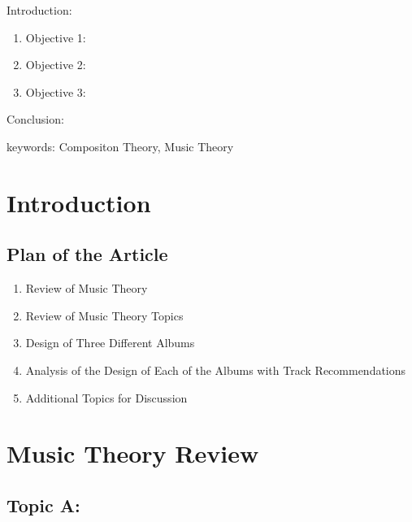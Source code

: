 


\twocolumn
\scriptsize
\begin{frontmatter}
		\title{}
		\author{}
		\address{The Mathematical Learning Space}
\end{frontmatter}	

Introduction:
\begin{enumerate}
\item Objective 1:
\item Objective 2:
\item Objective 3:
\end{enumerate}
Conclusion:

keywords: Compositon Theory, Music Theory

\section{Introduction}


\subsection{Plan of the Article}

\begin{enumerate}
\item Review of Music Theory
\item Review of Music Theory Topics
\item Design of Three Different Albums
\item Analysis of the Design of Each of the Albums with Track Recommendations
\item Additional Topics for Discussion
\end{enumerate}

\section{Music Theory Review}

\subsection{Topic A:}

